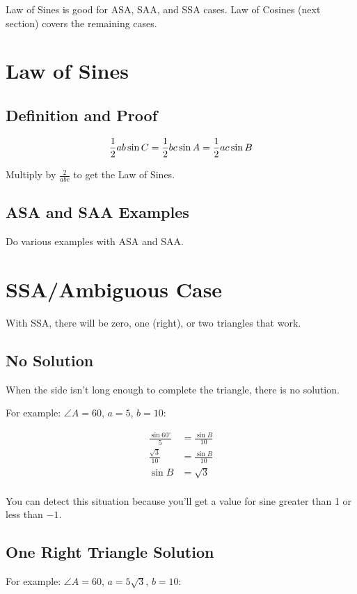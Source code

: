 \documentclass{exam}
\newcommand{\dg}{\ensuremath{^\circ}}
\begin{document}
  Law of Sines is good for ASA, SAA, and SSA cases.  Law of Cosines (next section) covers the remaining cases.

  \section{Law of Sines}

  \subsection{Definition and Proof}

  \[
    \frac{1}{2} ab \sin C = \frac{1}{2} bc \sin A = \frac{1}{2} ac \sin B \\
  \]

  Multiply by $\frac{2}{abc}$ to get the Law of Sines.

  \subsection{ASA and SAA Examples}
  Do various examples with ASA and SAA.

  \section{SSA/Ambiguous Case}
  With SSA, there will be zero, one (right), or two triangles that work.

  \subsection{No Solution}
  When the side isn't long enough to complete the triangle, there is no solution.

  For example: $\angle A = 60$, $a = 5$, $b = 10$:

  \begin{align*}
    \frac{\sin 60 \dg}{5} & = \frac{\sin B}{10} \\
    \frac{\sqrt{3}}{10}   & = \frac{\sin B}{10} \\
    \sin B                & = \sqrt{3} \\
  \end{align*}

  You can detect this situation because you'll get a value for sine greater than 1 or less than $-1$.

  \subsection{One Right Triangle Solution}
  For example: $\angle A = 60$, $a = 5 \sqrt{3}$, $b = 10$:
\end{document}
